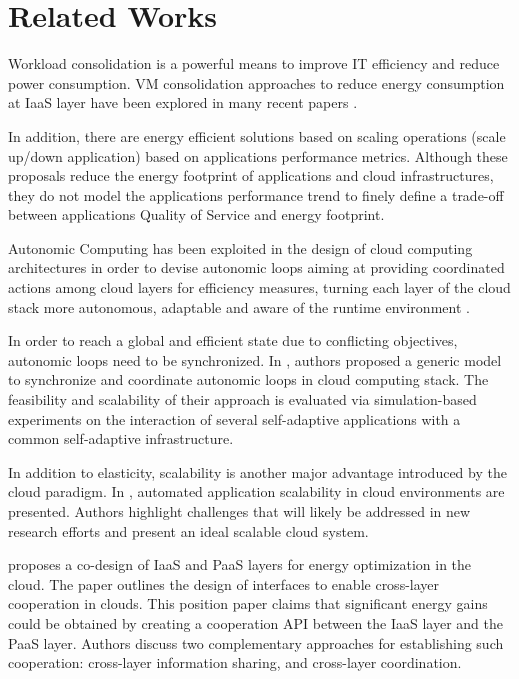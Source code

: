 \section{Related Works}
\label{sec: relworks}

Workload consolidation is a powerful means to improve IT efficiency and reduce power consumption.
VM consolidation approaches to reduce energy consumption at IaaS layer have been explored in many recent papers \cite{Cardosa} \cite{ITProf1} \cite{Schroder} \cite{Hermenier2009} \cite{sheikhalishahi_energy_2011} \cite{sheikhalishahi_multi-capacity_2014} \cite{dupont2015plug4green}.

In addition, there are energy efficient solutions based on scaling operations (scale up/down application) based on applications performance metrics.
Although these proposals reduce the energy footprint of applications and cloud infrastructures, they do not model the applications performance trend to finely define a trade-off between applications Quality of Service and energy footprint.

Autonomic Computing has been exploited in the design of cloud computing architectures in order to devise autonomic loops aiming at providing coordinated actions among cloud layers for efficiency measures, turning each layer of the cloud stack more autonomous, adaptable and aware of the runtime environment \cite{alvares_de_oliveira_synchronization_2012} \cite{de_oliveira_self-management_2012}  \cite{de_oliveira_framework_2013}.

In order to reach a global and efficient state due to conflicting objectives, autonomic loops need to be synchronized.
In \cite{alvares_de_oliveira_synchronization_2012}, authors proposed a generic model to synchronize and coordinate autonomic loops in cloud computing stack. 
The feasibility and scalability of their approach is evaluated via simulation-based experiments on the interaction of several self-adaptive applications with a common self-adaptive infrastructure.

In addition to elasticity, scalability is another major advantage introduced by the cloud paradigm.
In \cite{vaquero_dynamically_2011}, automated application scalability in cloud environments are presented.
Authors highlight challenges that will likely be addressed in new research efforts and present an ideal scalable cloud system.

\cite{carpen-amarie_towards_2014} proposes a co-design of IaaS and PaaS layers for energy optimization in the cloud.
The paper outlines the design of interfaces to enable cross-layer cooperation in clouds.
This position paper claims that significant energy gains could be obtained by creating a cooperation API between the IaaS layer and the PaaS layer.
Authors discuss two complementary approaches for establishing such cooperation: cross-layer information sharing, and cross-layer coordination.
